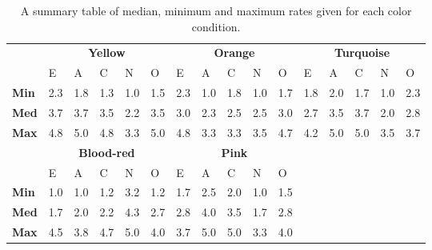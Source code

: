 \begin{table}[!htb]
    \renewcommand{\arraystretch}{1}
    \begin{center}
        \begin{tabular}{p{}|
        p{}|p{}|p{}|p{}|p{}||
        p{}|p{}|p{}|p{}|p{}||
        p{}|p{}|p{}|p{}|p{}|}
            \cline{2-16}
            & \multicolumn{5}{c||}{\textbf{Yellow}} & \multicolumn{5}{c||}{\textbf{Orange}}
            & \multicolumn{5}{c|}{\textbf{Turquoise}} \\
            \cline{2-16}
            & E & A & C & N & O & E & A & C & N & O & E & A & C & N & O      \\
            \cline{2-16}
            \textbf{Min}    & 2.3 & 1.8 & 1.3 & 1.0 & 1.5 & 2.3 & 1.0 & 1.8 & 1.0 & 1.7 & 1.8 & 2.0 & 1.7 & 1.0 & 2.3  \\
            \textbf{Med}    & 3.7 & 3.7 & 3.5 & 2.2 & 3.5 & 3.0 & 2.3 & 2.5 & 2.5 & 3.0 & 2.7 & 3.5 & 3.7 & 2.0 & 2.8  \\
            \textbf{Max}    & 4.8 & 5.0 & 4.8 & 3.3 & 5.0 & 4.8 & 3.3 & 3.3 & 3.5 & 4.7 & 4.2 & 5.0 & 5.0 & 3.5 & 3.7 \\
            \cline{2-16}
            \cline{2-11}
            &  \multicolumn{5}{|c||}{\textbf{Blood-red}} & \multicolumn{5}{|c||}{\textbf{Pink}} \\
            \cline{2-11}
            & E & A & C & N & O & E & A & C & N & O            \\
            \cline{2-11}
            \textbf{Min}    & 1.0 & 1.0 & 1.2 & 3.2 & 1.2 & 1.7 & 2.5 & 2.0 & 1.0 & 1.5    \\
            \textbf{Med}    & 1.7 & 2.0 & 2.2 & 4.3 & 2.7 & 2.8 & 4.0 & 3.5 & 1.7 & 2.8    \\
            \textbf{Max}    & 4.5 & 3.8 & 4.7 & 5.0 & 4.0 & 3.7 & 5.0 & 5.0 & 3.3 & 4.0    \\
            \cline{2-11}
        \end{tabular}
        \caption[]{A summary table of median, minimum and maximum rates given for each color condition.\footnotemark}
        \label{table:medianML2}
    \end{center}
\end{table}


